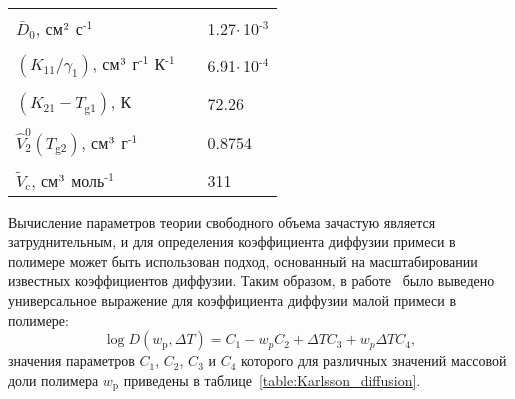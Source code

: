 \begin{table}[h]
\begin{tabular}{l c l}
		\\ \\ [-1em]
		$\bar{D}_0$, см$^\text{2}$ с$^\text{-1}$ & \hspace{1em} & 1.27\:$\cdot$\,10$^\text{-3}$
		\\ \\ [-1em]
		$(K_{11} / \gamma_1)$, см$^\text{3}$ г$^\text{-1}$ К$^\text{-1}$ & \hspace{1em} & 6.91\:$\cdot$\,10$^\text{-4}$
		\\ \\ [-1em]
		$(K_{21}-T_\mathrm{g1})$, К & \hspace{1em} & 72.26
		\\ \\ [-1em]
		$\hat{V}_2^0(T_\mathrm{g2})$, см$^\text{3}$ г$^\text{-1}$ & \hspace{1em} & 0.8754
		\\ \\ [-1em]
		$\tilde{V}_\mathrm{c}$, см$^\text{3}$ моль$^\text{-1}$ & \hspace{1em} & 311 \\ \hline \hline
	\end{tabular}
	\label{table:D_free_volume}
\end{table}

Вычисление параметров теории свободного объема зачастую является затруднительным, и для определения коэффициента диффузии примеси в полимере может быть использован подход, основанный на масштабировании известных коэффициентов диффузии. Таким образом, в работе~\cite{Karlsson2001_diffusion} было выведено универсальное выражение для коэффициента диффузии малой примеси в полимере:
\begin{equation} \label{eq:Karlsson_diffusion}
	\log D (w_\mathrm{p}, \Delta T) = C_1 - w_p C_2 + \Delta T C_3 + w_p \Delta T C_4,
\end{equation}
значения параметров $C_1$, $C_2$, $C_3$ и $C_4$ которого для различных значений массовой доли полимера $w_\mathrm{p}$ приведены в таблице~\ref{table:Karlsson_diffusion}.

